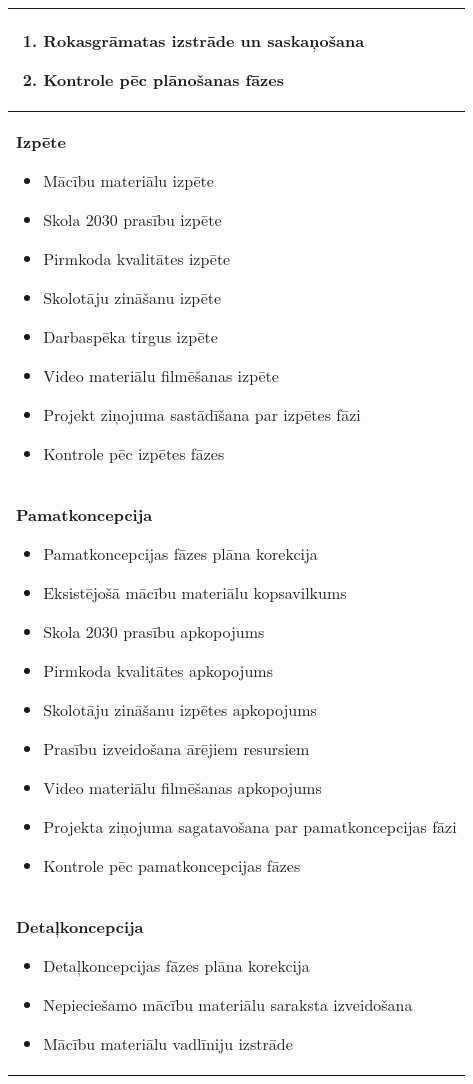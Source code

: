 \begin{longtable}{|p{}|}
\begin{enumerate}
          \item Rokasgrāmatas izstrāde un saskaņošana
          \item Kontrole pēc plānošanas fāzes
        \end{enumerate}\\
      \hline
        \textbf{Izpēte}
        \begin{itemize}
          \item Mācību materiālu izpēte
          \item Skola 2030 prasību izpēte
          \item Pirmkoda kvalitātes izpēte
          \item Skolotāju zināšanu izpēte
          \item Darbaspēka tirgus izpēte
          \item Video materiālu filmēšanas izpēte
          \item Projekt ziņojuma sastādīšana par izpētes fāzi
          \item Kontrole pēc izpētes fāzes
        \end{itemize}\\
      \hline
        \textbf{Pamatkoncepcija}
        \begin{itemize}
          \item Pamatkoncepcijas fāzes plāna korekcija
          \item Eksistējošā mācību materiālu kopsavilkums
          \item Skola 2030 prasību apkopojums
          \item Pirmkoda kvalitātes apkopojums
          \item Skolotāju zināšanu izpētes apkopojums
          \item Prasību izveidošana ārējiem resursiem
          \item Video materiālu filmēšanas apkopojums
          \item Projekta ziņojuma sagatavošana par pamatkoncepcijas fāzi
          \item Kontrole pēc pamatkoncepcijas fāzes
        \end{itemize}\\
      \hline
        \textbf{Detaļkoncepcija}
        \begin{itemize}
          \item Detaļkoncepcijas fāzes plāna korekcija
          \item Nepieciešamo mācību materiālu saraksta izveidošana
          \item Mācību materiālu vadlīniju izstrāde

\end{itemize}
\end{longtable}
